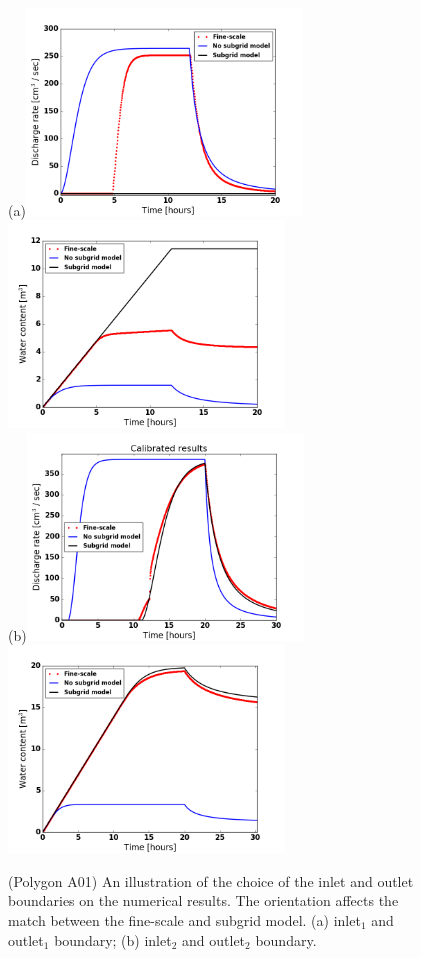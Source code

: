 \documentclass[review,11pt]{elsarticle}
\begin{document}
\begin{figure}[!h]
\centering
(a)\includegraphics[width=6.cm, height=5.5cm]{./figures/POLYGON_A01/POLYGON_A01discharge.png}
\includegraphics[width=6.cm, height=5.5cm]{./figures/POLYGON_A01/POLYGON_A01watercontent.png}\\
(b)\includegraphics[width=6.cm, height=5.5cm]{./figures/POLYGON_A01/POLYGON_A01discharge-CalibDDManningTest3.png}
\includegraphics[width=6.cm, height=5.5cm]{./figures/POLYGON_A01/POLYGON_A01WC-CalibDDManningTest3.png}
\caption{(Polygon A01) An illustration of the choice of the inlet and outlet boundaries on the numerical results. The orientation affects the match between the fine-scale and subgrid model. (a) inlet$_1$ and outlet$_1$ boundary; (b) inlet$_2$ and outlet$_2$  boundary.}
\label{polygon-A01-fig2}
\end{figure}
\end{document}
